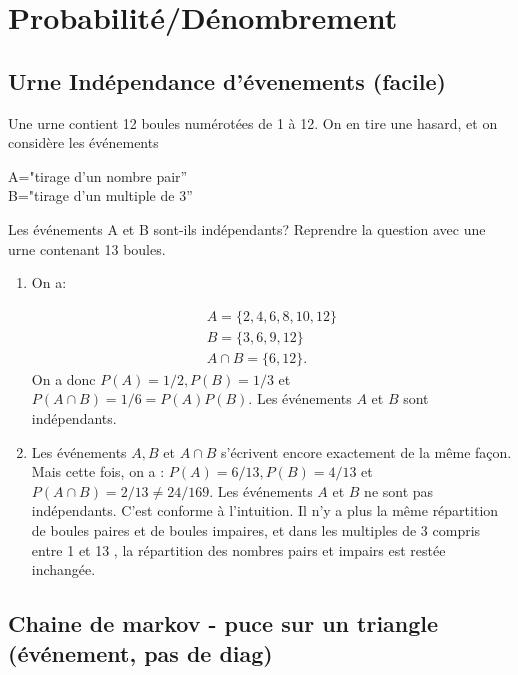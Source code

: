 \section{Probabilité/Dénombrement}

\subsection{Urne Indépendance d'évenements (facile)}

\begin{exercice}
 Une urne contient 12 boules numérotées de 1 à 12. On en tire une hasard, et on considère les événements
\begin{center}
A="tirage d'un nombre pair''\\
B="tirage d'un multiple de 3''
\end{center}
Les événements A et B sont-ils indépendants?
 Reprendre la question avec une urne contenant 13 boules.
\end{exercice}



\begin{correction}
\begin{enumerate}
  \item On a:

$$
\begin{gathered}
A=\{2,4,6,8,10,12\} \\
B=\{3,6,9,12\} \\
A \cap B=\{6,12\} .
\end{gathered}
$$
On a donc $P(A)=1 / 2, P(B)=1 / 3$ et $P(A \cap B)=1 / 6=P(A) P(B) .$ Les événements $A$ et $B$ sont indépendants.\\
\item  Les événements $A, B$ et $A \cap B$ s'écrivent encore exactement de la même façon. Mais cette fois, on a : $P(A)=6 / 13, P(B)=4 / 13$ et $P(A \cap B)=2 / 13 \neq 24 / 169$. Les événements $A$ et $B$ ne sont pas indépendants. C'est conforme à l'intuition. Il n'y a plus la même répartition de boules paires et de boules impaires, et dans les multiples de 3 compris entre 1 et 13 , la répartition des nombres pairs et impairs est restée inchangée.
\end{enumerate}
\end{correction}


\subsection{Chaine de markov - puce sur un triangle (événement, pas de diag)}




